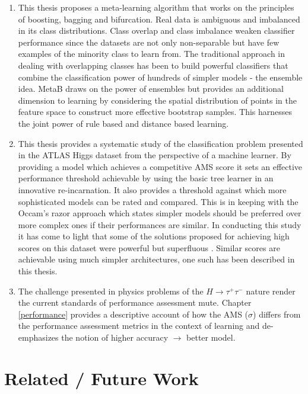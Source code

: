 
\begin{enumerate}

\item This thesis proposes a meta-learning algorithm that works on the principles of boosting, bagging and bifurcation. Real data is ambiguous and imbalanced in its class distributions. Class overlap and class imbalance weaken classifier performance since the datasets are not only non-separable but have few examples of the minority class to learn from. The traditional approach in dealing with overlapping classes has been to build powerful classifiers that combine the classification power of hundreds of simpler models - the ensemble idea. MetaB draws on the power of ensembles but provides an additional dimension to learning by considering the spatial distribution of points in the feature space to construct more effective bootstrap samples. This harnesses the joint power of rule based and distance based learning.   

\item This thesis provides a systematic study of the classification problem presented in the ATLAS Higgs dataset from the perspective of a machine learner. By providing a model which achieves a competitive AMS score it sets an effective performance threshold achievable by using the basic tree learner in an innovative re-incarnation. It also provides a threshold against which more sophisticated models can be rated and compared. This is in keeping with the Occam's razor approach which states simpler models should be preferred over more complex ones if their performances are similar. In conducting this study it has come to light that some of the solutions proposed for achieving high scores on this dataset were powerful but superfluous \citep{melis}. Similar scores are achievable using much simpler architectures, one such has been described in this thesis. 

\item The challenge presented in physics problems of the $H \rightarrow \tau^{+}\tau^{-}$ nature render the current standards of performance assessment mute. Chapter \ref{performance} provides a descriptive account of how the AMS ($\sigma$) differs from the performance assessment metrics in the context of learning and de-emphasizes the notion of higher accuracy $\rightarrow$ better model. 

\end{enumerate}

\section{Related / Future Work}

